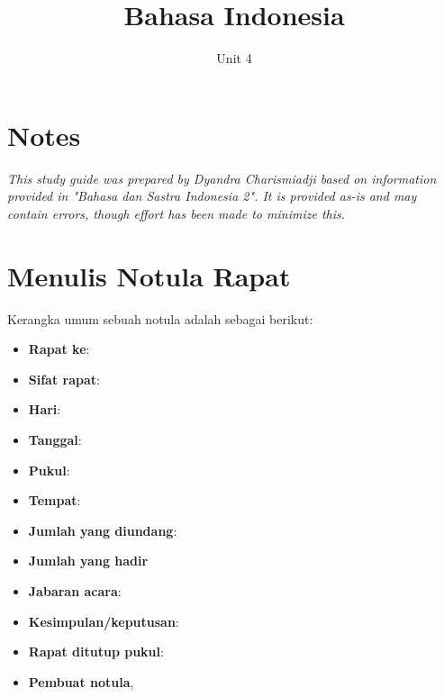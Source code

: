 \documentclass[12pt,a4paper]{article}
\begin{document}
\title{\textbf {Bahasa Indonesia}}
\date{Unit 4}
\maketitle
\tableofcontents{}
\section*{Notes}
\textit{This study guide was prepared by Dyandra Charismiadji based on information provided in "Bahasa dan Sastra Indonesia 2". It is provided as-is and may contain errors, though effort has been made to minimize this. }

\newpage
\section{Menulis Notula Rapat}
Kerangka umum sebuah notula adalah sebagai berikut:
\begin{itemize}
    \item \textbf {Rapat ke}:
    \item \textbf {Sifat rapat}: 
    \item \textbf {Hari}:
    \item \textbf {Tanggal}:
    \item \textbf {Pukul}:
    \item \textbf {Tempat}:
    \item \textbf {Jumlah yang diundang}:
    \item \textbf {Jumlah yang hadir}
    \item \textbf {Jabaran acara}:
    \item \textbf {Kesimpulan/keputusan}:
    \item \textbf {Rapat ditutup pukul}:
    \item \textbf {Pembuat notula},
\end{itemize}

\newpage
\end{document}
